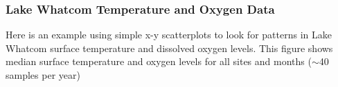 \documentclass[10pt]{beamer}
\begin{document}
\begin{frame}
\frametitle{Lake Whatcom Temperature and Oxygen Data}

\begin{center}
\end{center} 

\vspace*{-4ex}
{\scriptsize Here is an example using simple x-y scatterplots to look for
  patterns in Lake Whatcom surface temperature and
  dissolved oxygen levels.  This figure shows median surface
  temperature and oxygen levels for all sites and months ($\sim$40
  samples per year)\\}

\end{frame}
\end{document}
